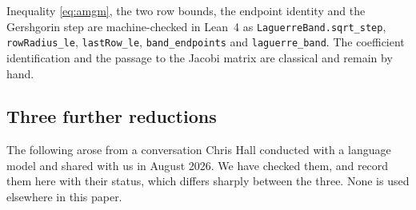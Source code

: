 \documentclass[11pt]{article}
\theoremstyle{remark}
\begin{document}
Inequality \eqref{eq:amgm}, the two row bounds, the endpoint identity and the
Gershgorin step are machine-checked in Lean~4 as \texttt{LaguerreBand.sqrt\_step},
\texttt{rowRadius\_le}, \texttt{lastRow\_le}, \texttt{band\_endpoints} and
\texttt{laguerre\_band}. The coefficient identification and the passage to the Jacobi
matrix are classical and remain by hand.

\subsection{Three further reductions}\label{sec:further}

The following arose from a conversation Chris Hall conducted with a language model and
shared with us in August 2026. We have checked them, and record them here with their
status, which differs sharply between the three. None is used elsewhere in this paper.
\end{document}
